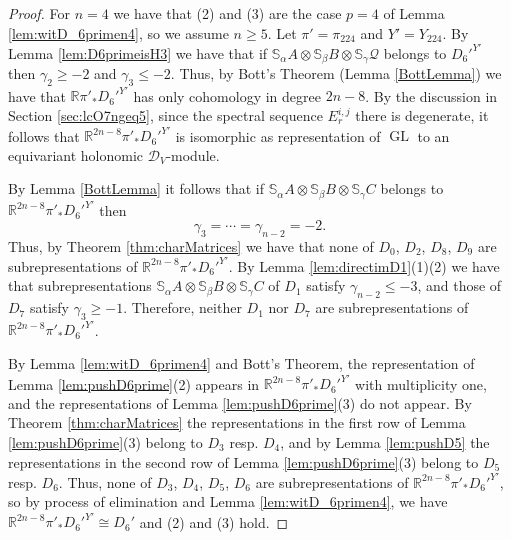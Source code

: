 \documentclass[11pt,reqno]{amsart}
\newcommand{\D}{\mathcal{D}}
\newcommand{\oo}{\otimes}
\newcommand{\bS}{\mathbb{S}}
\newcommand{\GL}{\operatorname{GL}}
\newcommand{\mc}[1]{\mathcal{#1}}
\numberwithin{equation}{section}
\begin{document}
\begin{proof}
 For $n=4$ we have that (2) and (3) are the case $p=4$ of Lemma \ref{lem:witD_6primen4}, so we assume $n\geq 5$. Let $\pi'=\pi_{224}$ and $Y'=Y_{224}$. By Lemma \ref{lem:D6primeisH3} we have that if $\bS_{\alpha}A\oo \bS_{\beta}B\oo \bS_{\gamma}\mc{Q}$ belongs to $D_6'^{Y'}$ then $\gamma_2\geq -2$ and $\gamma_3\leq -2$. Thus, by Bott's Theorem (Lemma \ref{BottLemma}) we have that $\mathbb{R}\pi'_{\ast}D_6'^{Y'}$ has only cohomology in degree $2n-8$. By the discussion in Section \ref{sec:lcO7ngeq5}, since the spectral sequence $E_r^{i,j}$ there is degenerate, it follows that $\mathbb{R}^{2n-8}\pi'_{\ast}D_6'^{Y'}$ is isomorphic as representation of $\GL$ to an equivariant holonomic $\D_V$-module. 

By Lemma \ref{BottLemma} it follows that if $\bS_{\alpha}A\oo \bS_{\beta}B\oo \bS_{\gamma}C$ belongs to $\mathbb{R}^{2n-8}\pi'_{\ast}D_6'^{Y'}$ then 
$$
\gamma_3=\cdots=\gamma_{n-2}=-2.
$$
Thus, by Theorem \ref{thm:charMatrices} we have that none of $D_0$, $D_2$, $D_8$, $D_9$ are subrepresentations of $\mathbb{R}^{2n-8}\pi'_{\ast}D_6'^{Y'}$. By Lemma \ref{lem:directimD1}(1)(2) we have that subrepresentations $\bS_{\alpha}A\oo \bS_{\beta}B\oo \bS_{\gamma}C$ of $D_1$ satisfy $\gamma_{n-2}\leq -3$, and those of $D_7$ satisfy $\gamma_3\geq -1$. Therefore, neither $D_1$ nor $D_7$ are subrepresentations of $\mathbb{R}^{2n-8}\pi'_{\ast}D_6'^{Y'}$.

  By Lemma \ref{lem:witD_6primen4} and Bott's Theorem, the representation of Lemma \ref{lem:pushD6prime}(2) appears in $\mathbb{R}^{2n-8}\pi'_{\ast}D_6'^{Y'}$ with multiplicity one, and the representations of Lemma \ref{lem:pushD6prime}(3) do not appear. By Theorem \ref{thm:charMatrices} the representations in the first row of Lemma \ref{lem:pushD6prime}(3) belong to $D_3$ resp. $D_4$, and by Lemma \ref{lem:pushD5} the representations in the second row of Lemma \ref{lem:pushD6prime}(3) belong to $D_5$ resp. $D_6$. Thus, none of $D_3$, $D_4$, $D_5$, $D_6$ are subrepresentations of $\mathbb{R}^{2n-8}\pi'_{\ast}D_6'^{Y'}$, so by process of elimination and Lemma \ref{lem:witD_6primen4}, we have $\mathbb{R}^{2n-8}\pi'_{\ast}D_6'^{Y'}\cong D_6'$ and (2) and (3) hold.
\end{proof}
\end{document}
